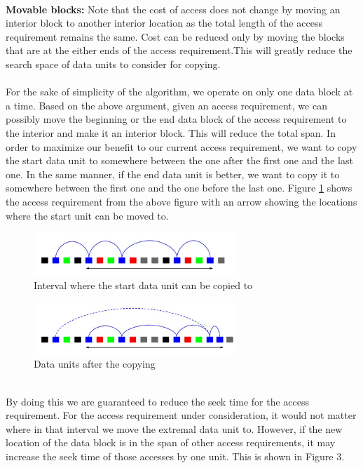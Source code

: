 \documentclass[conference]{acmsiggraph}
\begin{document}
\\
{\bf Movable blocks:} Note that the cost of access does not change by moving an interior block to another interior location as the total length of the access requirement remains the same. Cost can be reduced only by moving the blocks that are at the either ends of the access requirement.This will greatly reduce the search space of data units to consider for copying. \\
\\
For the sake of simplicity of the algorithm, we operate on only one data block at a time. Based on the above argument, given an access requirement, we can possibly move the beginning or the end data block of the access requirement to the interior and make it an interior block. This will reduce the total span. In order to maximize our benefit to our current access requirement, we want to copy the start data unit to somewhere between the one after the first one and the last one. In the same manner, if the end data unit is better, we want to copy it to somewhere between the first one and the one before the last one. Figure \ref{singleARafterCopy} shows the access requirement from the above figure with an arrow showing the locations where the start unit can be moved to. \\
\begin{figure}[ht]
\centering
\includegraphics[width=3in]{SingleAR_afterCopy1.jpg}
\caption{Interval where the start data unit can be copied to}
\label{singleARafterCopy}
\end{figure}
\begin{figure}[ht]
\centering
\includegraphics[width=3in]{SingleAR_afterCopy2.jpg}
\caption{Data units after the copying}
\label{singleARafterCopy2}
\end{figure}
\\
By doing this we are guaranteed to reduce the seek time for the access requirement. For the access requirement under consideration, it would not matter where in that interval we move the extremal data unit to. However, if the new location of the data block is in the span of other access requirements, it may increase the seek time of those accesses by one unit. This is shown in Figure 3. \\
\end{document}
